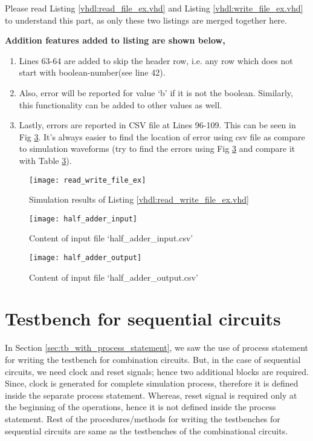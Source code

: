 Please read Listing \ref{vhdl:read_file_ex.vhd} and Listing \ref{vhdl:write_file_ex.vhd} to understand this part, as only these two listings are merged together here. 

\textbf{Addition features added to listing are shown below, }
\begin{enumerate}
	\item Lines 63-64 are added to skip the header row, i.e. any row which does not start with boolean-number(see line 42).
	\item  Also, error will be reported for value `b' if it is not the boolean. Similarly, this functionality can be added to other values as well.
	\item Lastly, errors are reported in CSV file at Lines 96-109. This can be seen in Fig \ref{fig:half_adder_output}. It's always easier to find the location of error using csv file as compare to simulation waveforms (try to find the errors using Fig \ref{fig:half_adder_output} and compare it with Table \ref{fig:half_adder_output}).  
	
\end{enumerate}




\begin{figure}[!h]
	\centering
	\texttt{[image: read\_write\_file\_ex]}
	\caption{Simulation results of Listing \ref{vhdl:read_write_file_ex.vhd}}
	\label{fig:read_write_file_ex}
\end{figure}

\begin{figure}[!h]
	\centering
	\texttt{[image: half\_adder\_input]}
	\caption{Content of input file `half\_adder\_input.csv'}
	\label{fig:half_adder_input}
\end{figure}

\begin{figure}[!h]
	\centering
	\texttt{[image: half\_adder\_output]}
	\caption{Content of input file `half\_adder\_output.csv'}
	\label{fig:half_adder_output}
\end{figure}


\section{Testbench for sequential circuits}

In Section \ref{sec:tb_with_process_statement}, we saw the use of process statement for writing the testbench for combination circuits. But, in the case of sequential circuits, we need clock and reset signals; hence two additional blocks are required. Since, clock is generated for complete simulation process, therefore it is defined inside the separate process statement. Whereas, reset signal is required only at the beginning of the operations, hence it is not defined inside the process statement. Rest of the procedures/methods for writing the testbenches for sequential circuits are same as the testbenches of the combinational circuits. 

